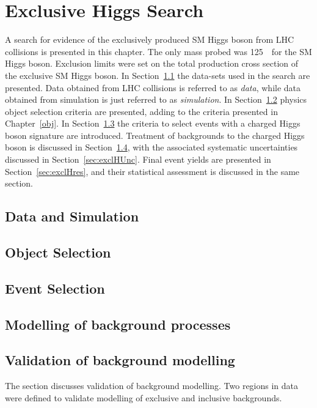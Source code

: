 \chapter{Exclusive Higgs Search}
\label{exclH}
\begin{chapabstract}
A search for evidence of the exclusively produced SM Higgs boson from LHC collisions is 
presented in this chapter. The only mass probed was 125~\GeV\ for the SM Higgs boson.
Exclusion limits were 
set on the total production cross section of the exclusive SM 
Higgs boson.  
In Section~\ref{sec:dataSimExclH} the data-sets used in the search are presented. Data obtained from 
LHC collisions is referred to as {\it data}, while data obtained from simulation is just referred to 
as {\it simulation}. In Section~\ref{sec:objExclH} physics object selection criteria are presented, adding to the 
 criteria presented in Chapter~\ref{obj}. In Section~\ref{sec:selExclH} the 
criteria to select events with a charged Higgs boson 
signature are introduced. Treatment of backgrounds to the charged Higgs boson is discussed in 
Section~\ref{sec:bkgExclH}, with the associated systematic uncertainties discussed in Section~\ref{sec:exclHUnc}. 
Final event yields are presented in Section~\ref{sec:exclHres}, and their statistical assessment is 
discussed in the same section.
\end{chapabstract}

\section{Data and Simulation}
\label{sec:dataSimExclH}


\section{Object Selection}
\label{sec:objExclH}


\section{Event Selection}
\label{sec:selExclH}


\section{Modelling of background processes}
\label{sec:bkgExclH}


\section{Validation of background modelling}
\label{sec:exclHCR}
\par The section discusses validation of background modelling. Two regions in data were 
defined to validate modelling of exclusive and inclusive backgrounds. 

